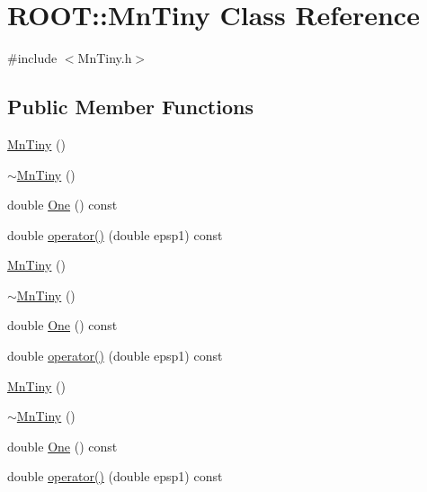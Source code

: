 \hypertarget{classROOT_1_1Minuit2_1_1MnTiny}{}\section{R\+O\+OT\+:\+:Mn\+Tiny Class Reference}
\label{classROOT_1_1Minuit2_1_1MnTiny}


{\ttfamily \#include $<$Mn\+Tiny.\+h$>$}

\subsection*{Public Member Functions}
\begin{DoxyCompactItemize}
\item 
\mbox{\hyperlink{classROOT_1_1Minuit2_1_1MnTiny_a4dde4acb4a2fbc96da80a4c3a507b87f}{Mn\+Tiny}} ()
\item 
\mbox{\hyperlink{classROOT_1_1Minuit2_1_1MnTiny_a6d03471f2c8c81a1bdc7a6a4c24e4e65}{$\sim$\+Mn\+Tiny}} ()
\item 
double \mbox{\hyperlink{classROOT_1_1Minuit2_1_1MnTiny_a5934fc324da865f57dc05e5182248677}{One}} () const
\item 
double \mbox{\hyperlink{classROOT_1_1Minuit2_1_1MnTiny_ae266eaf0c58687bf37419ca463c51bf7}{operator()}} (double epsp1) const
\item 
\mbox{\hyperlink{classROOT_1_1Minuit2_1_1MnTiny_a4dde4acb4a2fbc96da80a4c3a507b87f}{Mn\+Tiny}} ()
\item 
\mbox{\hyperlink{classROOT_1_1Minuit2_1_1MnTiny_a6d03471f2c8c81a1bdc7a6a4c24e4e65}{$\sim$\+Mn\+Tiny}} ()
\item 
double \mbox{\hyperlink{classROOT_1_1Minuit2_1_1MnTiny_a5934fc324da865f57dc05e5182248677}{One}} () const
\item 
double \mbox{\hyperlink{classROOT_1_1Minuit2_1_1MnTiny_ae266eaf0c58687bf37419ca463c51bf7}{operator()}} (double epsp1) const
\item 
\mbox{\hyperlink{classROOT_1_1Minuit2_1_1MnTiny_a4dde4acb4a2fbc96da80a4c3a507b87f}{Mn\+Tiny}} ()
\item 
\mbox{\hyperlink{classROOT_1_1Minuit2_1_1MnTiny_a6d03471f2c8c81a1bdc7a6a4c24e4e65}{$\sim$\+Mn\+Tiny}} ()
\item 
double \mbox{\hyperlink{classROOT_1_1Minuit2_1_1MnTiny_a5934fc324da865f57dc05e5182248677}{One}} () const
\item 
double \mbox{\hyperlink{classROOT_1_1Minuit2_1_1MnTiny_ae266eaf0c58687bf37419ca463c51bf7}{operator()}} (double epsp1) const
\end{DoxyCompactItemize}


